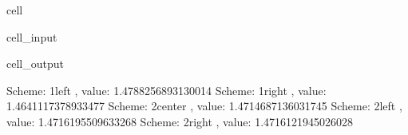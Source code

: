 \documentclass[letterpaper,10pt,english]{jupyterBook}
\begin{document}
\begin{sphinxuseclass}{cell}\begin{sphinxVerbatimInput}

\begin{sphinxuseclass}{cell_input}
\begin{sphinxVerbatim}[commandchars=\\\{\}]
   

       

    

    
     
\end{sphinxVerbatim}

\end{sphinxuseclass}\end{sphinxVerbatimInput}
\begin{sphinxVerbatimOutput}

\begin{sphinxuseclass}{cell_output}
\begin{sphinxVerbatim}[commandchars=\\\{\}]
Scheme: 1\PYGZus{}left    , value: \PYGZhy{}1.4788256893130014
Scheme: 1\PYGZus{}right   , value: \PYGZhy{}1.4641117378933477
Scheme: 2\PYGZus{}center  , value: \PYGZhy{}1.4714687136031745
Scheme: 2\PYGZus{}left    , value: \PYGZhy{}1.4716195509633268
Scheme: 2\PYGZus{}right   , value: \PYGZhy{}1.4716121945026028
\end{sphinxVerbatim}

\end{sphinxuseclass}\end{sphinxVerbatimOutput}

\end{sphinxuseclass}
\sphinxstepscope
\end{document}
